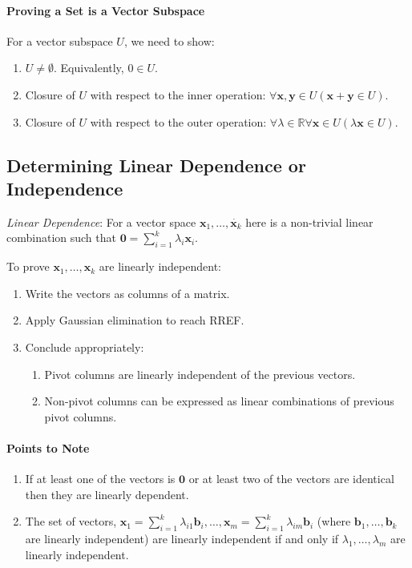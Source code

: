 \documentclass[10pt,twoside,twocolumn]{article}
\newcommand{\R}[0]{\mathds{R}} %
\begin{document}
\paragraph{Proving a Set is a Vector Subspace}

For a vector subspace $U$, we need to show: 
\begin{enumerate}
\item $U\neq\emptyset$. Equivalently, $0\in U$. 
\item Closure of $U$ with respect to the inner operation: $\forall\mathbf{x},\mathbf{y}\in U\left(\mathbf{x}+\mathbf{y}\in U\right)$. 
\item Closure of $U$ with respect to the outer operation: $\forall\lambda\in\R\forall\mathbf{x}\in U\left(\lambda\mathbf{x}\in U\right)$. 
\end{enumerate}

\subsection{Determining Linear Dependence or Independence}

\emph{Linear Dependence}: For a vector space $\mathbf{x}_{1},\dots,\dot{\mathbf{x}_{k}}$
here is a non-trivial linear combination such that $\mathbf{0}=\sum_{i=1}^{k}\lambda_{i}\mathbf{x}_{i}$.

To prove $\mathbf{x}_{1},\dots,\mathbf{x}_{k}$ are linearly independent: 
\begin{enumerate}
\item Write the vectors as columns of a matrix. 
\item Apply Gaussian elimination to reach RREF. 
\item Conclude appropriately:

\begin{enumerate}
\item Pivot columns are linearly independent of the previous vectors. 
\item Non-pivot columns can be expressed as linear combinations of previous
pivot columns. 
\end{enumerate}
\end{enumerate}

\paragraph{Points to Note}
\begin{enumerate}
\item If at least one of the vectors is $\mathbf{0}$ or at least two of
the vectors are identical then they are linearly dependent. 
\item The set of vectors, $\mathbf{x}_{1}=\sum_{i=1}^{k}\lambda_{i1}\mathbf{b}_{i},\dots,\mathbf{x}_{m}=\sum_{i=1}^{k}\lambda_{im}\mathbf{b}_{i}$
(where $\mathbf{b}_{1},\dots,\mathbf{b}_{k}$ are linearly independent)
are linearly independent if and only if $\lambda_{1},\dots,\lambda_{m}$
are linearly independent. 
\end{enumerate}
\end{document}
